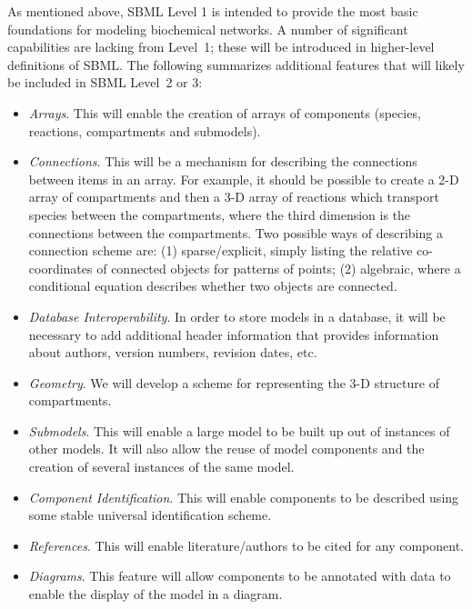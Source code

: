 \documentclass[10pt]{cekarticle}
\newcommand{\changed}[1]{\textcolor{BrickRed}{#1}}
\begin{document}
As mentioned above, SBML Level 1 is intended to provide the most basic
foundations for modeling biochemical networks.  A number of significant
capabilities are lacking from Level~1; these will be introduced in
higher-level definitions of SBML.  The following summarizes additional
features that will likely be included in SBML Level~2 \changed{or 3}:
\begin{itemize}  
  
\item \emph{Arrays}.  This will enable the creation of arrays of components
  (species, reactions, compartments and submodels).
   
\item \emph{Connections}.  This will be a mechanism for describing the
  connections between items in an array.  For example, it should be
  possible to create a 2-D array of compartments and then a 3-D array of
  reactions which transport species between the compartments, where the
  third dimension is the connections between the compartments.  Two
  possible ways of describing a connection scheme are: (1) sparse/explicit,
  simply listing the relative co-coordinates of connected objects for
  patterns of points; (2) algebraic, where a conditional equation describes
  whether two objects are connected.
  
\item \emph{Database Interoperability}.  In order to store models in a
  database, it will be necessary to add additional header information that
  provides information about authors, version numbers, revision dates, etc.

\item \emph{Geometry}.  We will develop a scheme for representing the 3-D
  structure of compartments.
  
\item \emph{Submodels}.  This will enable a large model to be built up out
  of instances of other models.  It will also allow the reuse of model
  components and the creation of several instances of the same model.
  
\item \emph{Component Identification}.  This will enable components to be
  described using some stable universal identification scheme.
  
\item \emph{References}.  This will enable literature/authors to be cited
  for any component.
  
\item \emph{Diagrams}.  \changed{This feature will allow components to be annotated
  with data to enable the display of the model in a diagram.}

\end{itemize}
\end{document}
